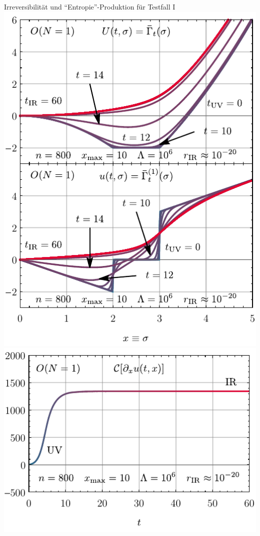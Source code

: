 \begin{frame}{Irreversibilität und ``Entropie''-Produktion für Testfall I}
	\label{0dentropie}
	\centering
	\includegraphics[width=0.47\framewidth]{../0d/figures/sc_i_on=1_n=800_xmax=10_lambda=1.0e6_tir=60_rg_flow.pdf}\hspace{.5cm}
	\includegraphics[width=0.47\framewidth]{../0d/figures/sc_i_on=1_n=800_xmax=10_lambda=1.0e6_tir=60_entropy_flow.pdf} 
\end{frame}


